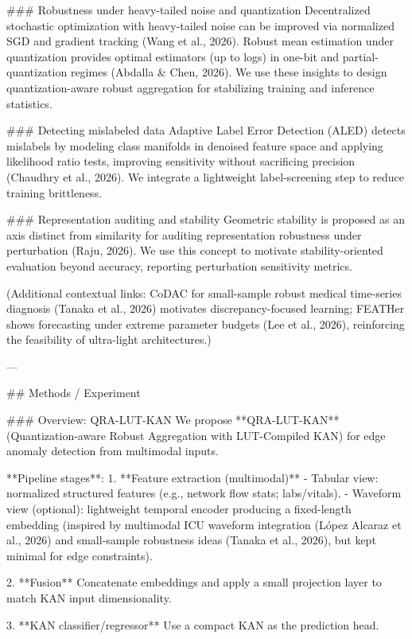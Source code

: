 ### Robustness under heavy-tailed noise and quantization  
Decentralized stochastic optimization with heavy-tailed noise can be improved via normalized SGD and gradient tracking (Wang et al., 2026). Robust mean estimation under quantization provides optimal estimators (up to logs) in one-bit and partial-quantization regimes (Abdalla & Chen, 2026). We use these insights to design quantization-aware robust aggregation for stabilizing training and inference statistics.

### Detecting mislabeled data  
Adaptive Label Error Detection (ALED) detects mislabels by modeling class manifolds in denoised feature space and applying likelihood ratio tests, improving sensitivity without sacrificing precision (Chaudhry et al., 2026). We integrate a lightweight label-screening step to reduce training brittleness.

### Representation auditing and stability  
Geometric stability is proposed as an axis distinct from similarity for auditing representation robustness under perturbation (Raju, 2026). We use this concept to motivate stability-oriented evaluation beyond accuracy, reporting perturbation sensitivity metrics.

(Additional contextual links: CoDAC for small-sample robust medical time-series diagnosis (Tanaka et al., 2026) motivates discrepancy-focused learning; FEATHer shows forecasting under extreme parameter budgets (Lee et al., 2026), reinforcing the feasibility of ultra-light architectures.)

---

## Methods / Experiment  

### Overview: QRA-LUT-KAN  
We propose **QRA-LUT-KAN** (Quantization-aware Robust Aggregation with LUT-Compiled KAN) for edge anomaly detection from multimodal inputs.

**Pipeline stages**:  
1. **Feature extraction (multimodal)**  
   - Tabular view: normalized structured features (e.g., network flow stats; labs/vitals).  
   - Waveform view (optional): lightweight temporal encoder producing a fixed-length embedding (inspired by multimodal ICU waveform integration (López Alcaraz et al., 2026) and small-sample robustness ideas (Tanaka et al., 2026), but kept minimal for edge constraints).  

2. **Fusion**  
   Concatenate embeddings and apply a small projection layer to match KAN input dimensionality.

3. **KAN classifier/regressor**  
   Use a compact KAN as the prediction head.

